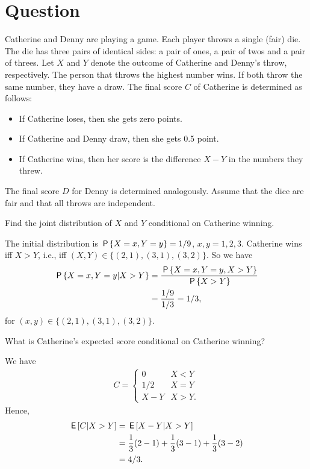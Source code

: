 \section{Question}


Catherine and Denny are playing a game. Each player throws a single (fair) die. The die has three pairs of identical sides: a pair of ones, a pair of twos and a pair of threes. Let $X$ and $Y$ denote the outcome of Catherine and Denny's throw, respectively. The person that throws the highest number wins. If both throw the same number, they have a draw. The final score $C$ of Catherine is determined as follows:
\begin{itemize}
    \item If Catherine loses, then she gets zero points.
    \item If Catherine and Denny draw, then she gets 0.5 point.
    \item If Catherine wins, then her score is the difference $X -Y$ in the numbers they threw.
\end{itemize}
The final score $D$ for Denny is determined analogously. Assume that the dice are fair and that all throws are independent.

\begin{exercise}[1]
Find the joint distribution of $X$ and $Y$ conditional on Catherine winning.
\begin{solution}
The initial distribution is $\P{X = x, Y = y} = 1/9$, $x,y = 1,2,3$. Catherine wins iff $X>Y$, i.e., iff $(X,Y) \in \{(2,1), (3,1), (3,2)\}$. So we have
\begin{align}
    \P{X=x,Y=y | X>Y} &= \frac{\P{X=x,Y=y,X>Y}}{\P{X>Y}} \\
    &= \frac{1/9}{1/3} = 1/3,
\end{align}
for $(x,y) \in \{(2,1), (3,1), (3,2)\}$.
\end{solution}
\end{exercise}

\begin{exercise}[1.5]
What is Catherine's expected score conditional on Catherine winning?
\begin{solution}
We have
\begin{align}
    C = \begin{cases}
    0 &X < Y \\
    1/2 &X = Y \\
    X - Y &X > Y.
    \end{cases}
\end{align}
Hence,
\begin{align}
    \E{C|X>Y} &= \E{X-Y|X>Y} \\
    &= \frac{1}{3} (2-1) + \frac{1}{3} (3-1) + \frac{1}{3} (3-2) \\
    &= 4/3.
\end{align}
\end{solution}
\end{exercise}

